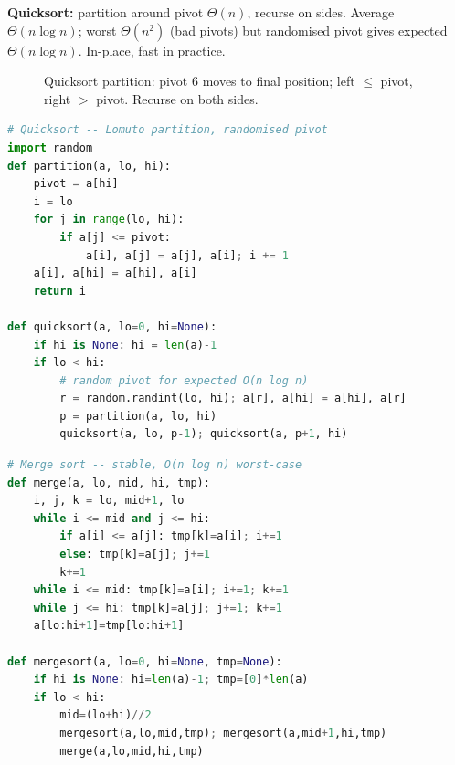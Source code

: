 \textbf{Quicksort:} partition around pivot $\Theta(n)$, recurse on sides. Average $\Theta(n\log n)$; worst $\Theta(n^{2})$ (bad pivots) but randomised pivot gives expected $\Theta(n\log n)$. In-place, fast in practice.

\begin{figure}[h]
\centering
{}
\caption{Quicksort partition: pivot $6$ moves to final position; left $\le$ pivot, right $>$ pivot. Recurse on both sides.}
\label{fig:quicksort-partition}
\end{figure}

\begin{lstlisting}[language=Python]
# Quicksort -- Lomuto partition, randomised pivot
import random
def partition(a, lo, hi):
    pivot = a[hi]
    i = lo
    for j in range(lo, hi):
        if a[j] <= pivot:
            a[i], a[j] = a[j], a[i]; i += 1
    a[i], a[hi] = a[hi], a[i]
    return i

def quicksort(a, lo=0, hi=None):
    if hi is None: hi = len(a)-1
    if lo < hi:
        # random pivot for expected O(n log n)
        r = random.randint(lo, hi); a[r], a[hi] = a[hi], a[r]
        p = partition(a, lo, hi)
        quicksort(a, lo, p-1); quicksort(a, p+1, hi)
\end{lstlisting}

\begin{lstlisting}[language=Python]
# Merge sort -- stable, O(n log n) worst-case
def merge(a, lo, mid, hi, tmp):
    i, j, k = lo, mid+1, lo
    while i <= mid and j <= hi:
        if a[i] <= a[j]: tmp[k]=a[i]; i+=1
        else: tmp[k]=a[j]; j+=1
        k+=1
    while i <= mid: tmp[k]=a[i]; i+=1; k+=1
    while j <= hi: tmp[k]=a[j]; j+=1; k+=1
    a[lo:hi+1]=tmp[lo:hi+1]

def mergesort(a, lo=0, hi=None, tmp=None):
    if hi is None: hi=len(a)-1; tmp=[0]*len(a)
    if lo < hi:
        mid=(lo+hi)//2
        mergesort(a,lo,mid,tmp); mergesort(a,mid+1,hi,tmp)
        merge(a,lo,mid,hi,tmp)
\end{lstlisting}

